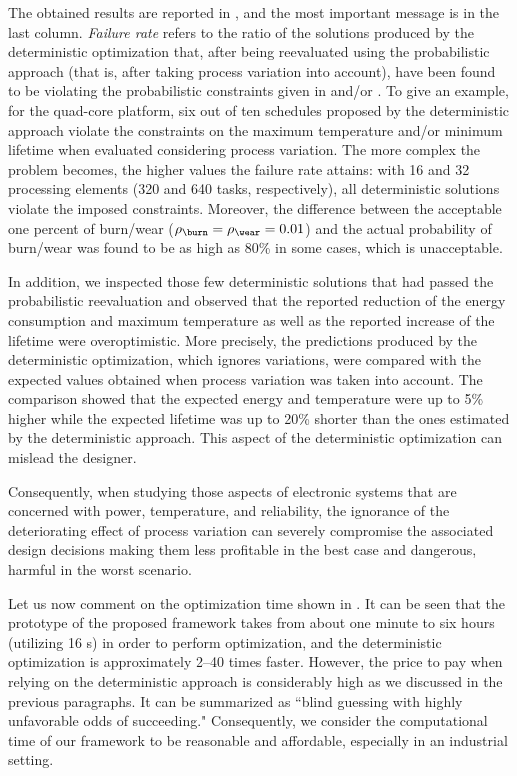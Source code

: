 The obtained results are reported in , and the most important
message is in the last column. \emph{Failure rate} refers to the ratio of the
solutions produced by the deterministic optimization that, after being
reevaluated using the probabilistic approach (that is, after taking process
variation into account), have been found to be violating the probabilistic
constraints given in  and/or
. To give an example, for the quad-core platform,
six out of ten schedules proposed by the deterministic approach violate the
constraints on the maximum temperature and/or minimum lifetime when evaluated
considering process variation. The more complex the problem becomes, the higher
values the failure rate attains: with 16 and 32 processing elements (320 and 640
tasks, respectively), all deterministic solutions violate the imposed
constraints. Moreover, the difference between the acceptable one percent of
burn/wear ($\rho_\burn = \rho_\wear = 0.01$) and the actual probability of
burn/wear was found to be as high as 80\% in some cases, which is unacceptable.

In addition, we inspected those few deterministic solutions that had passed the
probabilistic reevaluation and observed that the reported reduction of the
energy consumption and maximum temperature as well as the reported increase of
the lifetime were overoptimistic. More precisely, the predictions produced by
the deterministic optimization, which ignores variations, were compared with the
expected values obtained when process variation was taken into account. The
comparison showed that the expected energy and temperature were up to 5\% higher
while the expected lifetime was up to 20\% shorter than the ones estimated by
the deterministic approach. This aspect of the deterministic optimization can
mislead the designer.

Consequently, when studying those aspects of electronic systems that are
concerned with power, temperature, and reliability, the ignorance of the
deteriorating effect of process variation can severely compromise the associated
design decisions making them less profitable in the best case and dangerous,
harmful in the worst scenario.

Let us now comment on the optimization time shown in . It can
be seen that the prototype of the proposed framework takes from about one minute
to six hours (utilizing 16 s) in order to perform optimization, and
the deterministic optimization is approximately 2--40 times faster. However, the
price to pay when relying on the deterministic approach is considerably high as
we discussed in the previous paragraphs. It can be summarized as ``blind
guessing with highly unfavorable odds of succeeding." Consequently, we consider
the computational time of our framework to be reasonable and affordable,
especially in an industrial setting.

